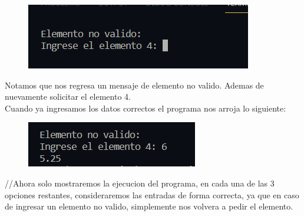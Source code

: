 \documentclass[12pt]{article}
\begin{document}
	\begin{figure}[H]
		\begin{center}
 			\includegraphics[width = .6\textwidth]{1_1.png}
		\end{center} 
	\end{figure}
	Notamos que nos regresa un mensaje de elemento no valido. Ademas de nuevamente solicitar el elemento 4.\\
	Cuando ya ingresamos los datos correctos el programa nos arroja lo siguiente:
	\begin{figure}[H]
		\begin{center}
 			\includegraphics[width = .6\textwidth]{1_2.png}
		\end{center} 
	\end{figure}
	//Ahora solo mostraremos la ejecucion del programa, en cada una de las 3 opciones restantes, consideraremos las entradas de forma correcta, ya que en caso de ingresar un elemento no valido, simplemente nos volvera a pedir el elemento.
\end{document}
